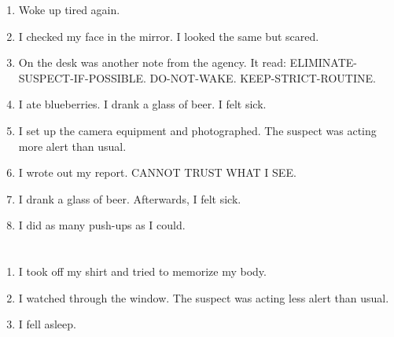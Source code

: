 \documentclass{article}
\begin{document}
    \begin{enumerate}
    
    \item Woke up tired again.\\
    
    \item I checked my face in the mirror. I looked the same but scared.\\
    
    \item On the desk was another note from the agency. It read: ELIMINATE-SUSPECT-IF-POSSIBLE. DO-NOT-WAKE. KEEP-STRICT-ROUTINE.\\
    
    \item I ate blueberries. I drank a glass of beer. I felt sick.\\
    
    \item I set up the camera equipment and photographed. The suspect was acting more alert than usual.\\
    
    \item I wrote out my report. CANNOT TRUST WHAT I SEE.\\
    
    \item I drank a glass of beer. Afterwards, I felt sick.\\
    
    \item I did as many push-ups as I could.\\
    
    \end{enumerate}
     
    \newpage
    
    \section{}
    
    \begin{enumerate}
    
    \item I took off my shirt and tried to memorize my body.\\
    
    \item I watched through the window. The suspect was acting less alert than usual.\\
    
    \item I fell asleep.\\
    
    \end{enumerate}
     
\end{document}
